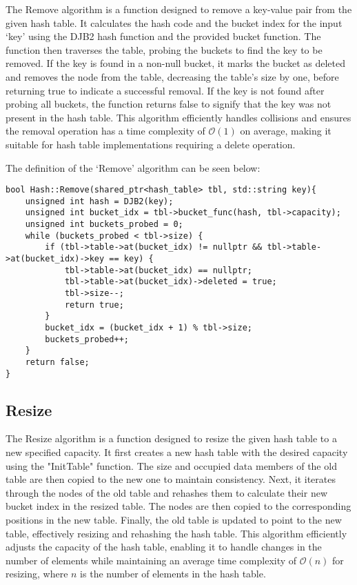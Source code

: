 The Remove algorithm is a function designed to remove a key-value pair from the given hash table. It calculates the hash code and the bucket index for the input `key' using the DJB2 hash function and 
the provided bucket function. The function then traverses the table, probing the buckets to find the key to be removed. If the key is found in a non-null bucket, it marks the bucket as deleted and removes 
the node from the table, decreasing the table's size by one, before returning true to indicate a successful removal. If the key is not found after probing all buckets, the function returns false to signify 
that the key was not present in the hash table. This algorithm efficiently handles collisions and ensures the removal operation has a time complexity of $\mathcal{O}(1)$ on average, making it suitable for 
hash table implementations requiring a delete operation.

\begin{highlight}

The definition of the `Remove' algorithm can be seen below:

\horizontalline

\begin{verbatim}
bool Hash::Remove(shared_ptr<hash_table> tbl, std::string key){
    unsigned int hash = DJB2(key);
    unsigned int bucket_idx = tbl->bucket_func(hash, tbl->capacity);
    unsigned int buckets_probed = 0;
    while (buckets_probed < tbl->size) {
        if (tbl->table->at(bucket_idx) != nullptr && tbl->table->at(bucket_idx)->key == key) {
            tbl->table->at(bucket_idx) == nullptr;
            tbl->table->at(bucket_idx)->deleted = true;
            tbl->size--;
            return true;
        }
        bucket_idx = (bucket_idx + 1) % tbl->size;
        buckets_probed++;
    }
    return false;
}
\end{verbatim}

\end{highlight}

\subsection*{Resize}

The Resize algorithm is a function designed to resize the given hash table to a new specified capacity. It first creates a new hash table with the desired capacity using the "InitTable" function. The size 
and occupied data members of the old table are then copied to the new one to maintain consistency. Next, it iterates through the nodes of the old table and rehashes them to calculate their new bucket index 
in the resized table. The nodes are then copied to the corresponding positions in the new table. Finally, the old table is updated to point to the new table, effectively resizing and rehashing the hash table. 
This algorithm efficiently adjusts the capacity of the hash table, enabling it to handle changes in the number of elements while maintaining an average time complexity of $\mathcal{O}(n)$ for resizing, where 
$n$ is the number of elements in the hash table.

